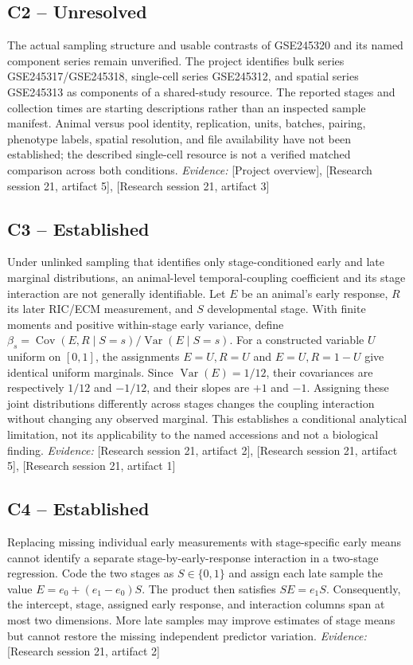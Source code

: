 \documentclass[11pt]{article}
\begin{document}
\subsection{C2 -- Unresolved}
The actual sampling structure and usable contrasts of GSE245320 and its named component series remain unverified.
The project identifies bulk series GSE245317/GSE245318, single-cell series GSE245312, and spatial series GSE245313 as components of a shared-study resource. The reported stages and collection times are starting descriptions rather than an inspected sample manifest. Animal versus pool identity, replication, units, batches, pairing, phenotype labels, spatial resolution, and file availability have not been established; the described single-cell resource is not a verified matched comparison across both conditions.
\textit{Evidence: }[Project overview], [Research session 21, artifact 5], [Research session 21, artifact 3]
\subsection{C3 -- Established}
Under unlinked sampling that identifies only stage-conditioned early and late marginal distributions, an animal-level temporal-coupling coefficient and its stage interaction are not generally identifiable.
Let $E$ be an animal's early response, $R$ its later RIC/ECM measurement, and $S$ developmental stage. With finite moments and positive within-stage early variance, define $\beta_s=\operatorname{Cov}(E,R\mid S=s)/\operatorname{Var}(E\mid S=s)$. For a constructed variable $U$ uniform on $[0,1]$, the assignments $E=U,R=U$ and $E=U,R=1-U$ give identical uniform marginals. Since $\operatorname{Var}(E)=1/12$, their covariances are respectively $1/12$ and $-1/12$, and their slopes are $+1$ and $-1$. Assigning these joint distributions differently across stages changes the coupling interaction without changing any observed marginal. This establishes a conditional analytical limitation, not its applicability to the named accessions and not a biological finding.
\textit{Evidence: }[Research session 21, artifact 2], [Research session 21, artifact 5], [Research session 21, artifact 1]
\subsection{C4 -- Established}
Replacing missing individual early measurements with stage-specific early means cannot identify a separate stage-by-early-response interaction in a two-stage regression.
Code the two stages as $S\in\{0,1\}$ and assign each late sample the value $E=e_0+(e_1-e_0)S$. The product then satisfies $SE=e_1S$. Consequently, the intercept, stage, assigned early response, and interaction columns span at most two dimensions. More late samples may improve estimates of stage means but cannot restore the missing independent predictor variation.
\textit{Evidence: }[Research session 21, artifact 2]
\end{document}
